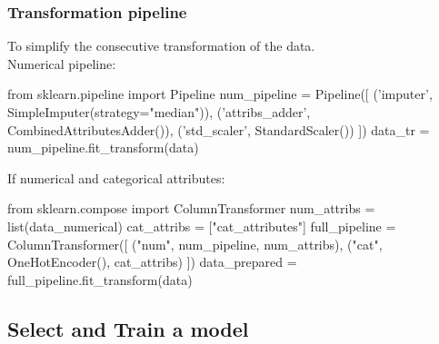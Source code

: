 \documentclass{article}
\begin{document}
    \subsubsection*{Transformation pipeline}
    To simplify the consecutive transformation of the data.\\
    Numerical pipeline:
    \begin{python}
      from sklearn.pipeline import Pipeline
      num_pipeline = Pipeline([
                  ('imputer', SimpleImputer(strategy="median")),
                  ('attribs_adder', CombinedAttributesAdder()),
                  ('std_scaler', StandardScaler())
                  ])
      data_tr = num_pipeline.fit_transform(data)
    \end{python}
    If numerical and categorical attributes:
    \begin{python}
      from sklearn.compose import ColumnTransformer
      num_attribs = list(data_numerical)
      cat_attribs = ["cat_attributes"]
      full_pipeline = ColumnTransformer([
            ("num", num_pipeline, num_attribs),
            ("cat", OneHotEncoder(), cat_attribs)
            ])
      data_prepared = full_pipeline.fit_transform(data)
    \end{python}

\subsection{Select and Train a model}
\end{document}
